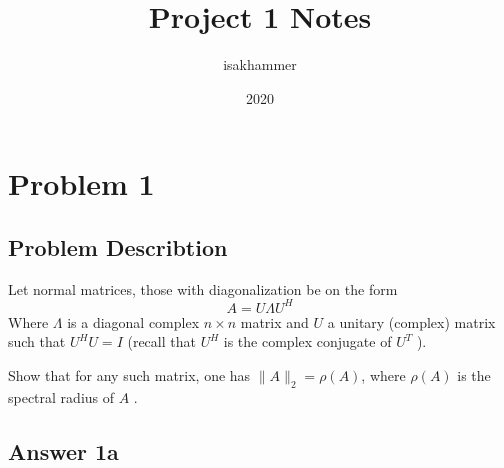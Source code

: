 \documentclass{article}
\title{Project 1 Notes}
\author{isakhammer }
\date{2020}
\theoremstyle{remark}
\newcommand{\newpara}
  {
  \vskip 0.4cm
  }
\begin{document}
\maketitle
\tableofcontents
\newpage

\newpage
\section{Problem 1}%
\label{sec:problem_1}
\subsection{Problem Describtion}%
\label{sub:problem_describtion}

Let normal matrices, those with diagonalization be on the form \[
A = U \Lambda U^{H} 
\] 
Where $\Lambda $ is a diagonal complex $n\times n $ matrix and $U$ a unitary (complex) matrix such that $U ^{H} U = I$ (recall that $U^{H}$ is the complex conjugate of $U^{T}$ ).
\newpara
Show that for any such matrix, one has $\|A\|_{2} = \rho \left( A \right)$, where $\rho \left( A \right) $ is the spectral radius of $A$ .

\subsection{Answer 1a}%
\label{sub:proof}
\end{document}
